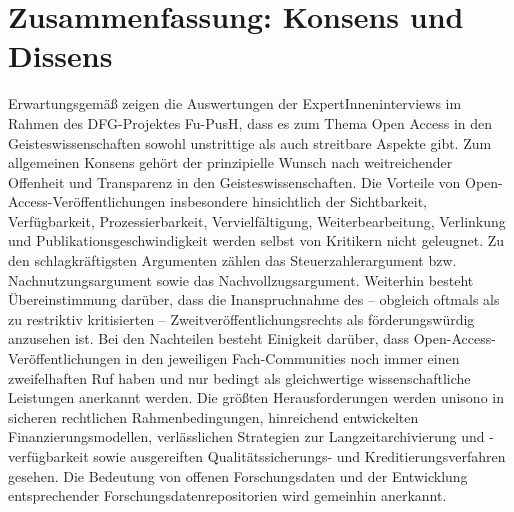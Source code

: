 \documentclass[a4paper,
fontsize=11pt,
oneside,
numbers=noperiodatend,
parskip=half-,
bibliography=totoc,
final
]{scrartcl}
\begin{document}
\section{Zusammenfassung: Konsens und
Dissens}\label{zusammenfassung-konsens-und-dissens}

Erwartungsgemäß zeigen die Auswertungen der ExpertInneninterviews im
Rahmen des DFG-Projektes Fu-PusH, dass es zum Thema Open Access in den
Geisteswissenschaften sowohl unstrittige als auch streitbare Aspekte
gibt. Zum allgemeinen Konsens gehört der prinzipielle Wunsch nach
weitreichender Offenheit und Transparenz in den Geisteswissenschaften.
Die Vorteile von Open-Access-Veröffentlichungen insbesondere
hinsichtlich der Sichtbarkeit, Verfügbarkeit, Prozessierbarkeit,
Vervielfältigung, Weiterbearbeitung, Verlinkung und
Publikationsgeschwindigkeit werden selbst von Kritikern nicht geleugnet.
Zu den schlagkräftigsten Argumenten zählen das Steuerzahlerargument bzw.
Nachnutzungsargument sowie das Nachvollzugsargument. Weiterhin besteht
Übereinstimmung darüber, dass die Inanspruchnahme des -- obgleich
oftmals als zu restriktiv kritisierten -- Zweitveröffentlichungsrechts
als förderungswürdig anzusehen ist. Bei den Nachteilen besteht Einigkeit
darüber, dass Open-Access-Veröffentlichungen in den jeweiligen
Fach-Communities noch immer einen zweifelhaften Ruf haben und nur
bedingt als gleichwertige wissenschaftliche Leistungen anerkannt werden.
Die größten Herausforderungen werden unisono in sicheren rechtlichen
Rahmenbedingungen, hinreichend entwickelten Finanzierungsmodellen,
verlässlichen Strategien zur Langzeitarchivierung und -verfügbarkeit
sowie ausgereiften Qualitätssicherungs- und Kreditierungsverfahren
gesehen. Die Bedeutung von offenen Forschungsdaten und der Entwicklung
entsprechender Forschungsdatenrepositorien wird gemeinhin anerkannt.
\end{document}
